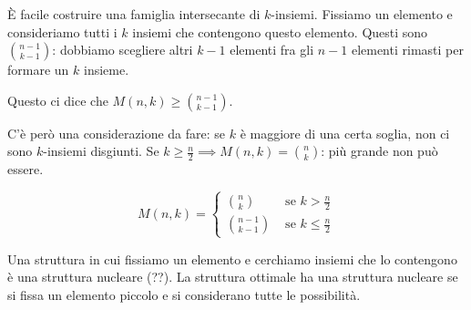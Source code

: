 		\`E facile costruire una famiglia intersecante di $k$-insiemi.
		Fissiamo un elemento e consideriamo tutti i $k$ insiemi che contengono questo elemento.
		Questi sono $\binom{n-1}{k-1}$: dobbiamo scegliere altri $k-1$ elementi fra gli $n-1$ elementi rimasti per formare un $k$ insieme.

		Questo ci dice che $M(n,k) \ge \binom{n-1}{k-1}$.

		C'\`e per\`o una considerazione da fare: se $k$ \`e maggiore di una certa soglia, non ci sono $k$-insiemi disgiunti.
		Se $k \ge \frac{n}{2} \implies M(n,k) = \binom{n}{k}$: pi\`u grande non pu\`o essere.

		\begin{theorem}
			\[
				M(n,k) =
				\begin{cases}
					\binom{n}{k} & \text{ se } k > \frac{n}{2} \\
					\binom{n-1}{k-1} & \text{ se } k \le \frac{n}{2}
				\end{cases}
			\]
		\end{theorem}
		Una struttura in cui fissiamo un elemento e cerchiamo insiemi che lo contengono \`e una struttura nucleare (??).
		La struttura ottimale ha una struttura nucleare se si fissa un elemento piccolo e si considerano tutte le possibilit\`a.

